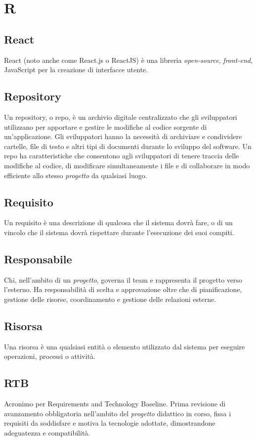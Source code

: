 \chapter{R}

\section{React}
React (noto anche come React.js o ReactJS) è una libreria \emph{open-source}, \emph{front-end}, JavaScript per la creazione di interfacce utente.

\section{Repository}
Un repository, o repo, è un archivio digitale centralizzato che gli sviluppatori utilizzano per apportare e gestire le modifiche al codice sorgente di un'applicazione. Gli sviluppatori hanno la necessità di archiviare e condividere cartelle, file di testo e altri tipi di documenti durante lo sviluppo del software. Un repo ha caratteristiche che consentono agli sviluppatori di tenere traccia delle modifiche al codice, di modificare simultaneamente i file e di collaborare in modo efficiente allo stesso \emph{progetto} da qualsiasi luogo. 

\section{Requisito}
Un requisito è una descrizione di qualcosa che il sistema dovrà fare, o di un vincolo che il sistema dovrà rispettare durante l’esecuzione dei suoi compiti.

\section{Responsabile}
Chi, nell'ambito di un \emph{progetto}, governa il team e rappresenta il progetto verso l'esterno. Ha responsabilità di scelta e approvazione oltre che di pianificazione, gestione delle risorse, coordinamento e gestione delle relazioni esterne. 

\section{Risorsa}
Una risorsa è una qualsiasi entità o elemento utilizzato dal sistema per eseguire operazioni, processi o attività.

\section{RTB}
Acronimo per Requirements and Technology Baseline. Prima revisione di avanzamento obbligatoria nell'ambito del \emph{progetto} didattico in corso, fissa i requisiti da soddisfare e motiva la tecnologie adottate, dimostrandone adeguatezza e compatibilità.
